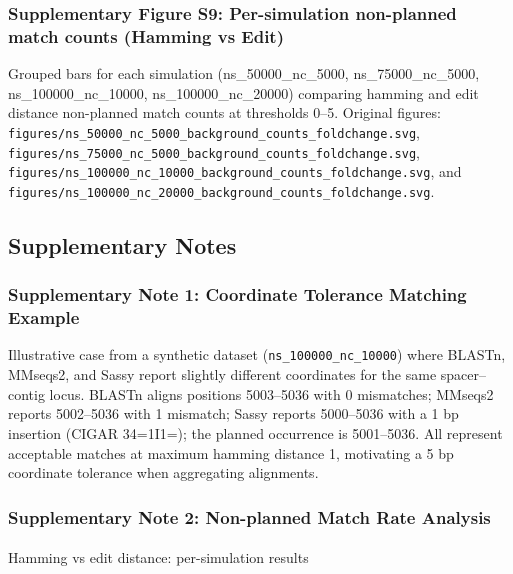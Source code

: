 \documentclass[
]{article}
\makeatletter
\let\oldparagraph\paragraph
\renewcommand{\paragraph}{
    \@ifstar
      \xxxParagraphStar
      \xxxParagraphNoStar
  }
\newcommand{\xxxParagraphStar}[1]{\oldparagraph*{#1}\mbox{}}
\newcommand{\xxxParagraphNoStar}[1]{\oldparagraph{#1}\mbox{}}
\makeatother
\begin{document}
\subsubsection{Supplementary Figure S9: Per-simulation non-planned match
counts (Hamming vs Edit)}\label{fig-supp-per-sim-background}

Grouped bars for each simulation (ns\_50000\_nc\_5000,
ns\_75000\_nc\_5000, ns\_100000\_nc\_10000, ns\_100000\_nc\_20000)
comparing hamming and edit distance non-planned match counts at
thresholds 0--5. Original figures:
\texttt{figures/ns\_50000\_nc\_5000\_background\_counts\_foldchange.svg},
\texttt{figures/ns\_75000\_nc\_5000\_background\_counts\_foldchange.svg},
\texttt{figures/ns\_100000\_nc\_10000\_background\_counts\_foldchange.svg},
and
\texttt{figures/ns\_100000\_nc\_20000\_background\_counts\_foldchange.svg}.

\subsection{Supplementary Notes}\label{supplementary-notes}

\subsubsection{Supplementary Note 1: Coordinate Tolerance Matching
Example}\label{note-supp-coord-tolerance}

Illustrative case from a synthetic dataset
(\texttt{ns\_100000\_nc\_10000}) where BLASTn, MMseqs2, and Sassy report
slightly different coordinates for the same spacer--contig locus. BLASTn
aligns positions 5003--5036 with 0 mismatches; MMseqs2 reports
5002--5036 with 1 mismatch; Sassy reports 5000--5036 with a 1 bp
insertion (CIGAR 34=1I1=); the planned occurrence is 5001--5036. All
represent acceptable matches at maximum hamming distance 1, motivating a
5 bp coordinate tolerance when aggregating alignments.

\subsubsection{Supplementary Note 2: Non-planned Match Rate
Analysis}\label{note-supp-nonplanned}

\paragraph{Hamming vs edit distance: per-simulation
results}\label{hamming-vs-edit-distance-per-simulation-results}
\end{document}
